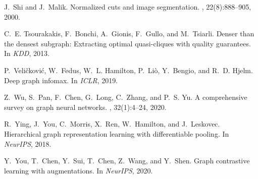 \documentclass{article} %
\theoremstyle{remark}
\begin{document}
\begin{thebibliography}{}
J.~Shi and J.~Malik.
\newblock Normalized cuts and image segmentation.
, 22(8):888--905, 2000.

C.~E. Tsourakakis, F.~Bonchi, A.~Gionis, F.~Gullo, and M.~Tsiarli.
\newblock Denser than the densest subgraph: Extracting optimal quasi-cliques
  with quality guarantees.
\newblock In {\em KDD}, 2013.

P.~Veli\v{c}kovi\'{c}, W.~Fedus, W.~L. Hamilton, P.~Li{\`o}, Y.~Bengio, and
  R.~D. Hjelm.
\newblock Deep graph infomax.
\newblock In {\em ICLR}, 2019.

Z.~Wu, S.~Pan, F.~Chen, G.~Long, C.~Zhang, and P.~S. Yu.
\newblock A comprehensive survey on graph neural networks.
, 32(1):4--24, 2020.

R.~Ying, J.~You, C.~Morris, X.~Ren, W.~Hamilton, and J.~Leskovec.
\newblock Hierarchical graph representation learning with differentiable
  pooling.
\newblock In {\em NeurIPS}, 2018.

Y.~You, T.~Chen, Y.~Sui, T.~Chen, Z.~Wang, and Y.~Shen.
\newblock Graph contrastive learning with augmentations.
\newblock In {\em NeurIPS}, 2020.
\end{thebibliography}
\end{document}
